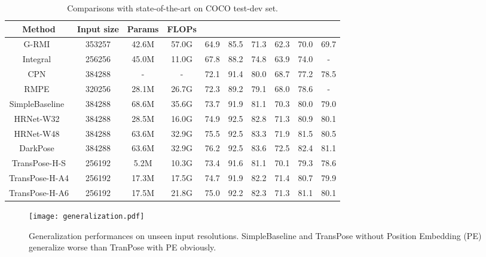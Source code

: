 \documentclass{article}
\begin{document}
\begin{table}\small 
	
	\centering
	\label{table:coco_test_dev}
	\renewcommand{\arraystretch}{1}
	\setlength{\tabcolsep}{0.9mm}
	\begin{tabular}{c|c|cc|cccccc}
		\toprule
		Method & Input size & Params & FLOPs& 
		 &  &  &  &  & \\
		\midrule
	
		G-RMI~\cite{papandreou2017towards}  & 353257 &42.6M & 57.0G
		&64.9 & 85.5&71.3&62.3&70.0&69.7\\
		Integral~\cite{sun2018integral} & 256256 &45.0M &11.0G
		&67.8 & 88.2&74.8&63.9&74.0&-\\

		CPN~\cite{chen2018cascaded}& 384288 &- &-
		& 72.1 & 91.4&80.0&68.7&77.2&78.5\\
		RMPE~\cite{fang2017rmpe} & 320256 &28.1M &26.7G
		&72.3 & 89.2&79.1&68.0&78.6&-\\

		SimpleBaseline~\cite{xiao2018simple} &384288  &68.6M & 35.6G
		&73.7 & 91.9&81.1&70.3&80.0&79.0\\
HRNet-W32~\cite{sun2019hrnet} & 384288 &28.5M& 16.0G&74.9&92.5&82.8&71.3&80.9&80.1\\
		HRNet-W48~\cite{sun2019hrnet} & 384288 &63.6M&32.9G& 75.5&92.5&83.3&71.9&81.5&80.5\\
		DarkPose~\cite{zhang2020distribution} & 384288 &63.6M&32.9G& 76.2&92.5&83.6&72.5&82.4&81.1\\
		\midrule
		TransPose-H-S & 256192 &5.2M&10.3G& 73.4&91.6&81.1&70.1&79.3&78.6\\
		TransPose-H-A4 & 256192 &17.3M&17.5G& 74.7&91.9&82.2&71.4&80.7&79.9\\
		TransPose-H-A6 & 256192 &17.5M&21.8G& 75.0&92.2&82.3&71.3&81.1&80.1\\
		\bottomrule

		
	\end{tabular}
	\caption{Comparisons with state-of-the-art on COCO test-dev set.}\vspace*{-0.1in}
	
	\label{coco-test}
	
\end{table}

	\begin{figure}
	\begin{center}
\texttt{[image: generalization.pdf]}
	\end{center}\vspace*{-0.15in}
	\caption{Generalization performances on unseen input resolutions. SimpleBaseline and TransPose without Position Embedding (PE) generalize worse than TranPose with PE obviously.} \vspace{-0.1in}
	\label{generalization_fig}
\end{figure}
\end{document}
